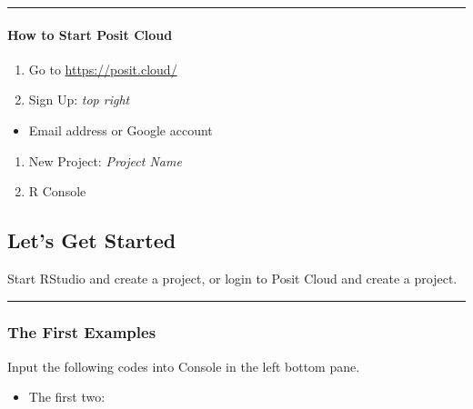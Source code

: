 \documentclass[
]{article}
\providecommand{\tightlist}{%
  \setlength{\itemsep}{0pt}\setlength{\parskip}{0pt}}
\begin{document}
\begin{center}\rule{0.5\linewidth}{0.5pt}\end{center}

\hypertarget{how-to-start-posit-cloud}{%
\paragraph{How to Start Posit Cloud}\label{how-to-start-posit-cloud}}

\begin{enumerate}
\def\labelenumi{\arabic{enumi}.}
\tightlist
\item
  Go to \url{https://posit.cloud/}
\item
  Sign Up: \emph{top right}
\end{enumerate}

\begin{itemize}
\tightlist
\item
  Email address or Google account
\end{itemize}

\begin{enumerate}
\def\labelenumi{\arabic{enumi}.}
\setcounter{enumi}{2}
\tightlist
\item
  New Project: \emph{Project Name}
\item
  R Console
\end{enumerate}

\hypertarget{lets-get-started}{%
\subsection{Let's Get Started}\label{lets-get-started}}

Start RStudio and create a project, or login to Posit Cloud and create a
project.

\begin{center}\rule{0.5\linewidth}{0.5pt}\end{center}

\hypertarget{the-first-examples}{%
\subsubsection{The First Examples}\label{the-first-examples}}

Input the following codes into Console in the left bottom pane.

\begin{itemize}
\tightlist
\item
  The first two:
\end{itemize}
\end{document}
